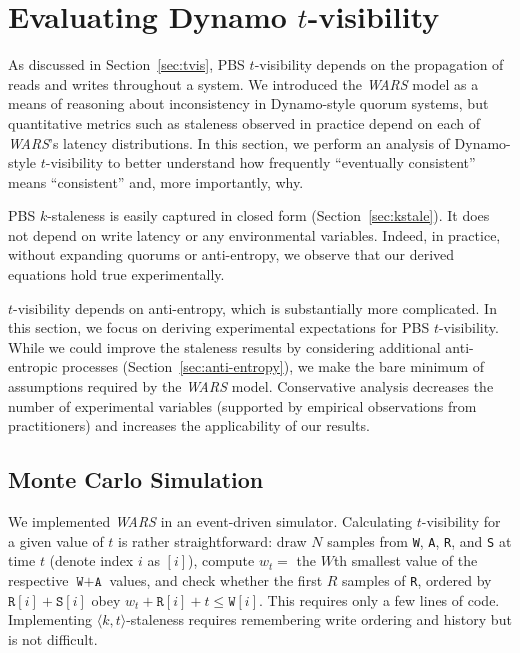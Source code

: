 \documentclass{vldb}
\newcommand{\sectionskip}{-0em}
\newcommand{\subsectionskip}{-0em}
\begin{document}
\vspace{\sectionskip}\section{Evaluating Dynamo {\large $t$}-visibility}
\label{sec:dynamoeval}

As discussed in Section~\ref{sec:tvis}, PBS $t$-visibility depends on
the propagation of reads and writes throughout a system.  We
introduced the \textit{WARS} model as a means of reasoning about
inconsistency in Dynamo-style quorum systems, but quantitative metrics
such as staleness observed in practice depend on each of
\textit{WARS}'s latency distributions.  In this section, we perform an
analysis of Dynamo-style $t$-visibility to better understand how
frequently ``eventually consistent'' means ``consistent'' and, more
importantly, why.

PBS $k$-staleness is easily captured in closed form
(Section~\ref{sec:kstale}).  It does not depend on write latency or
any environmental variables.  Indeed, in practice, without expanding
quorums or anti-entropy, we observe that our derived equations hold
true experimentally.

$t$-visibility depends on anti-entropy, which is substantially more
complicated.  In this section, we focus on deriving experimental
expectations for PBS $t$-visibility.  While we could improve the
staleness results by considering additional anti-entropic processes
(Section~\ref{sec:anti-entropy}), we make the bare minimum of
assumptions required by the \textit{WARS} model.  Conservative
analysis decreases the number of experimental variables (supported by
empirical observations from practitioners) and increases the
applicability of our results.

\vspace{\subsectionskip}\subsection{Monte Carlo Simulation}
\label{sec:mcsim}

We implemented \textit{WARS} in an event-driven simulator.
Calculating $t$-visibility for a given value of $t$ is rather
straightforward: draw $N$ samples from \texttt{W}, \texttt{A},
\texttt{R}, and \texttt{S} at time $t$ (denote index $i$ as $[i]$),
compute $w_t = $ the $W$th smallest value of the respective
$\texttt{W}+\texttt{A}$ values, and check whether the first $R$
samples of \texttt{R}, ordered by $\texttt{R}[i]+\texttt{S}[i]$ obey
$w_t+\texttt{R}[i] + t\leq \texttt{W}[i]$.  This requires only a few
lines of code.  Implementing $\langle k, t \rangle$-staleness requires
remembering write ordering and history but is not difficult.
\end{document}

